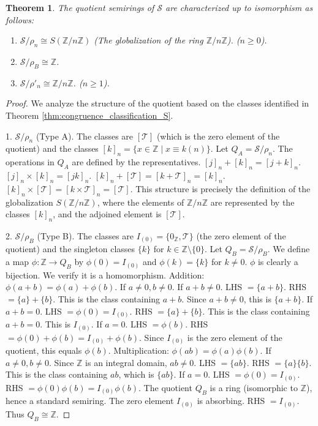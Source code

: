 \documentclass[11pt, a4paper]{article}
\theoremstyle{plain}
\newtheorem{theorem}{Theorem}[section]
\theoremstyle{definition}
\numberwithin{equation}{section}
\newcommand{\Z}{\mathbb{Z}}
\newcommand{\Tobj}{\mathcal{T}} %
\newcommand{\SemiringS}{\mathcal{S}}
\begin{document}
\begin{theorem}\label{thm:quotient_structures}
The quotient semirings of $\SemiringS$ are characterized up to isomorphism as follows:
\begin{enumerate}
    \item $\SemiringS/\rho_n \cong S(\Z/n\Z)$ (The globalization of the ring $\Z/n\Z$). ($n\ge 0$).
    \item $\SemiringS/\rho_B \cong \Z$.
    \item $\SemiringS/\rho'_n \cong \Z/n\Z$. ($n\ge 1$).
\end{enumerate}
\end{theorem}
\begin{proof}
We analyze the structure of the quotient based on the classes identified in Theorem \ref{thm:congruence_classification_S}.

1. $\SemiringS/\rho_n$ (Type A). The classes are $[\Tobj]$ (which is the zero element of the quotient) and the classes $[k]_n = \{x\in\Z \mid x\equiv k(n)\}$. Let $Q_A = \SemiringS/\rho_n$.
The operations in $Q_A$ are defined by the representatives.
$[j]_n+[k]_n=[j+k]_n$. $[j]_n\times[k]_n=[jk]_n$.
$[k]_n+[\Tobj]=[k+\Tobj]_n=[k]_n$. $[k]_n\times[\Tobj]=[k\times\Tobj]_n=[\Tobj]$.
This structure is precisely the definition of the globalization $S(\Z/n\Z)$, where the elements of $\Z/n\Z$ are represented by the classes $[k]_n$, and the adjoined element is $[\Tobj]$.

2. $\SemiringS/\rho_B$ (Type B). The classes are $I_{(0)}=\{0_{\Z}, \Tobj\}$ (the zero element of the quotient) and the singleton classes $\{k\}$ for $k\in\Z\setminus\{0\}$. Let $Q_B = \SemiringS/\rho_B$.
We define a map $\phi: \Z \to Q_B$ by $\phi(0)=I_{(0)}$ and $\phi(k)=\{k\}$ for $k\neq 0$.
$\phi$ is clearly a bijection. We verify it is a homomorphism.
Addition: $\phi(a+b) = \phi(a)+\phi(b)$.
If $a\neq 0, b\neq 0$.
If $a+b\neq 0$. LHS $=\{a+b\}$. RHS $=\{a\}+\{b\}$. This is the class containing $a+b$. Since $a+b\neq 0$, this is $\{a+b\}$.
If $a+b=0$. LHS $=\phi(0)=I_{(0)}$. RHS $=\{a\}+\{b\}$. This is the class containing $a+b=0$. This is $I_{(0)}$.
If $a=0$. LHS $=\phi(b)$. RHS $=\phi(0)+\phi(b) = I_{(0)}+\phi(b)$. Since $I_{(0)}$ is the zero element of the quotient, this equals $\phi(b)$.
Multiplication: $\phi(ab) = \phi(a)\phi(b)$.
If $a\neq 0, b\neq 0$. Since $\Z$ is an integral domain, $ab\neq 0$. LHS $=\{ab\}$. RHS $=\{a\}\{b\}$. This is the class containing $ab$, which is $\{ab\}$.
If $a=0$. LHS $=\phi(0)=I_{(0)}$. RHS $=\phi(0)\phi(b) = I_{(0)}\phi(b)$. The quotient $Q_B$ is a ring (isomorphic to $\Z$), hence a standard semiring. The zero element $I_{(0)}$ is absorbing. RHS $=I_{(0)}$.
Thus $Q_B \cong \Z$.


\end{proof}
\end{document}
